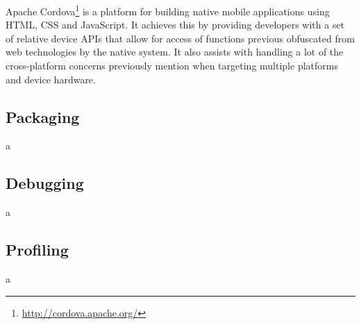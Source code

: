 \documentclass[final]{cmpreport}
\begin{document}
Apache Cordova\footnote{\url{http://cordova.apache.org/}} is a platform for building native mobile applications using HTML, CSS and JavaScript. It achieves this by providing developers with a set of relative device APIs that allow for access of functions previous obfuscated from web technologies by the native system. It also assists with handling a lot of the cross-platform concerns previously mention when targeting multiple platforms and device hardware.

\subsection{Packaging}
a

\subsection{Debugging}
a

\subsection{Profiling}
a


\clearpage

\end{document}
